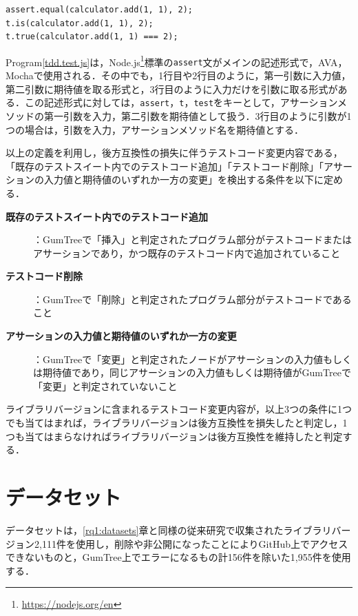 \documentclass[11pt,dvipdfmx]{jreport}
\begin{document}
\begin{lstlisting}[caption=アサーション例2, label=tdd.test.js]
assert.equal(calculator.add(1, 1), 2);
t.is(calculator.add(1, 1), 2);  
t.true(calculator.add(1, 1) === 2);
\end{lstlisting}

Program\ref{tdd.test.js}は，Node.js\footnote{\url{https://nodejs.org/en}}標準の{\verb|assert|}文がメインの記述形式で，AVA，Mochaで使用される．その中でも，1行目や2行目のように，第一引数に入力値，第二引数に期待値を取る形式と，3行目のように入力だけを引数に取る形式がある．この記述形式に対しては，{\verb|assert|}，{\verb|t|}，{\verb|test|}をキーとして，アサーションメソッドの第一引数を入力，第二引数を期待値として扱う．3行目のように引数が1つの場合は，引数を入力，アサーションメソッド名を期待値とする．

以上の定義を利用し，後方互換性の損失に伴うテストコード変更内容である，「既存のテストスイート内でのテストコード追加」「テストコード削除」「アサーションの入力値と期待値のいずれか一方の変更」を検出する条件を以下に定める．

\begin{description}
  \item[\textbf{既存のテストスイート内でのテストコード追加}]：GumTreeで「挿入」と判定されたプログラム部分がテストコードまたはアサーションであり，かつ既存のテストコード内で追加されていること
  \item[\textbf{テストコード削除}]：GumTreeで「削除」と判定されたプログラム部分がテストコードであること
  \item[\textbf{アサーションの入力値と期待値のいずれか一方の変更}]：GumTreeで「変更」と判定されたノードがアサーションの入力値もしくは期待値であり，同じアサーションの入力値もしくは期待値がGumTreeで「変更」と判定されていないこと
\end{description}

ライブラリバージョンに含まれるテストコード変更内容が，以上3つの条件に1つでも当てはまれば，ライブラリバージョンは後方互換性を損失したと判定し，1つも当てはまらなければライブラリバージョンは後方互換性を維持したと判定する．

\section{データセット}
データセットは，\ref{rq1:datasets}章と同様の従来研究\cite{matsuda}で収集されたライブラリバージョン2,111件を使用し，削除や非公開になったことによりGitHub上でアクセスできないものと，GumTree上でエラーになるもの計156件を除いた1,955件を使用する．
\end{document}
